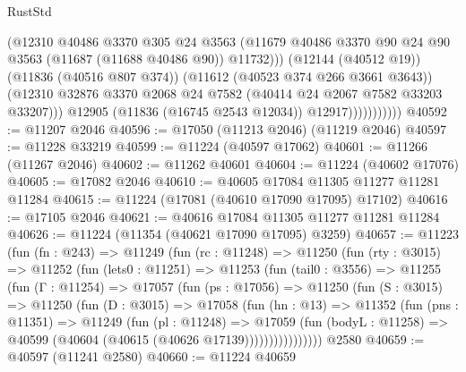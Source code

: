 \begin{lexlean}{RustStd}
\begin{coremodule}
                              (@12310
                                @40486
                                @3370
                                @305
                                @24
                                @3563
                                (@11679
                                  @40486
                                  @3370
                                  @90
                                  @24
                                  @90
                                  @3563
                                  (@11687 (@11688 @40486 @90))
                                  @11732)))
                            (@12144 (@40512 @19))
                            (@11836 (@40516 @807 @374))
                            (@11612 (@40523 @374 @266 @3661 @3643))
                            (@12310
                              @32876
                              @3370
                              @2068
                              @24
                              @7582
                              (@40414 @24 @2067 @7582 @33203 @33207)))
                          @12905
                          (@11836 (@16745 @2543 @12034))
                          @12917)))))))))))
@40592 := @11207 @2046
@40596 := @17050 (@11213 @2046) (@11219 @2046)
@40597 := @11228 @33219
@40599 := @11224 (@40597 @17062)
@40601 := @11266 (@11267 @2046)
@40602 := @11262 @40601
@40604 := @11224 (@40602 @17076)
@40605 := @17082 @2046
@40610 := @40605 @17084 @11305 @11277 @11281 @11284
@40615 := @11224 (@17081 (@40610 @17090 @17095) @17102)
@40616 := @17105 @2046
@40621 := @40616 @17084 @11305 @11277 @11281 @11284
@40626 := @11224 (@11354 (@40621 @17090 @17095) @3259)
@40657 := @11223
    (fun (fn : @243) =>
    @11249
      (fun (rc : @11248) =>
      @11250
        (fun (rty : @3015) =>
        @11252
          (fun (lets0 : @11251) =>
          @11253
            (fun (tail0 : @3556) =>
            @11255
              (fun (Γ : @11254) =>
              @17057
                (fun (ps : @17056) =>
                @11250
                  (fun (S : @3015) =>
                  @11250
                    (fun (D : @3015) =>
                    @17058
                      (fun (hn : @13) =>
                      @11352
                        (fun (pns : @11351) =>
                        @11249
                          (fun (pl : @11248) =>
                          @17059
                            (fun (bodyL : @11258) =>
                            @40599 (@40604 (@40615 (@40626 @17139))))))))))))))))
    @2580
@40659 := @40597 (@11241 @2580)
@40660 := @11224 @40659

\end{coremodule}
\end{lexlean}

